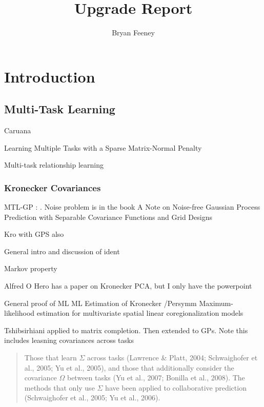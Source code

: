 \documentclass[10pt,fleqn]{article}
\title{Upgrade Report}
\author{Bryan Feeney}
\begin{document}
\maketitle
\begin{abstract}

\end{abstract}

\tableofcontents
\clearpage


\section{Introduction}
\subsection{Multi-Task Learning}

Caruana


Learning Multiple Tasks with a Sparse Matrix-Normal Penalty\cite{Zhang2010a}

Multi-task relationship learning\cite{Zhang2012mtrl}

\subsubsection{Kronecker Covariances}

MTL-GP : \cite{Bonilla2008}. Noise problem is in the book\cite{Wackernagel1998}
A Note on Noise-free Gaussian Process Prediction with Separable Covariance Functions and Grid Designs\cite{Williams2007}

Kro with GPS also \cite{Stegle2011}

General intro and discussion of ident \cite{Glanz2008}

Markov property \cite{Hagan1998}

Alfred O Hero has a paper on Kronecker PCA, but I only have the powerpoint

General proof of ML\cite{Srivastava2009}
ML Estimation of Kronecker /Persymm \cite{Jansson}
Maximum-likelihood estimation for multivariate spatial linear coregionalization models\cite{Zhang2007a}

Tshibsirhiani applied to matrix completion\cite{Allen2010}. Then extended to GPs\cite{Yu2009}. Note this includes leasning covariances across tasks

\begin{quote}
Those that learn $\Sigma$ across tasks (Lawrence \& Platt, 2004; Schwaighofer et al., 2005; Yu et al., 2005), and those that additionally consider the covariance $\Omega$ between tasks (Yu et al., 2007; Bonilla et al., 2008). The methods that only use $\Sigma$ have been applied to collaborative prediction (Schwaighofer et al., 2005; Yu et al., 2006).
\end{quote}
\end{document}
